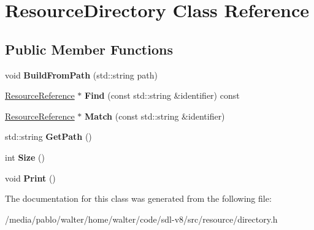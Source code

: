 \hypertarget{classResourceDirectory}{}\section{Resource\+Directory Class Reference}
\label{classResourceDirectory}
\subsection*{Public Member Functions}
\begin{DoxyCompactItemize}
\item 
\mbox{\label{classResourceDirectory_a047453f6e87254dde5a4d33e4ce5791c}} 
void {\bfseries Build\+From\+Path} (std\+::string path)
\item 
\mbox{\label{classResourceDirectory_a8fa4d67bec8abbb5a83cbc2228786d02}} 
\mbox{\hyperlink{classResourceReference}{Resource\+Reference}} $\ast$ {\bfseries Find} (const std\+::string \&identifier) const
\item 
\mbox{\label{classResourceDirectory_a328985a2130ef8fdc158344ec10dc4d0}} 
\mbox{\hyperlink{classResourceReference}{Resource\+Reference}} $\ast$ {\bfseries Match} (const std\+::string \&identifier)
\item 
\mbox{\label{classResourceDirectory_a9194392e5cb0de31170ffc2c38fcbea0}} 
std\+::string {\bfseries Get\+Path} ()
\item 
\mbox{\label{classResourceDirectory_a5a2a1443bd73d347733d6ebec091af6b}} 
int {\bfseries Size} ()
\item 
\mbox{\label{classResourceDirectory_abfffa43ce3ccf1ca88d2a70b0c1c54e2}} 
void {\bfseries Print} ()
\end{DoxyCompactItemize}


The documentation for this class was generated from the following file\+:\begin{DoxyCompactItemize}
\item 
/media/pablo/walter/home/walter/code/sdl-\/v8/src/resource/directory.\+h\end{DoxyCompactItemize}
